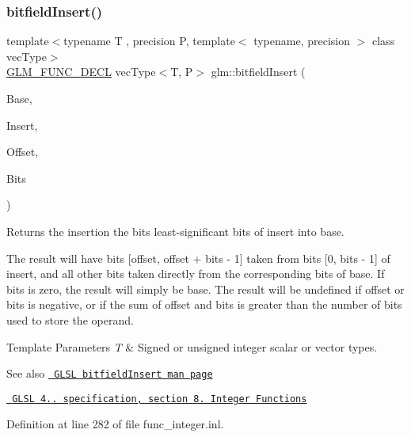 \subsubsection{\texorpdfstring{bitfieldInsert()}{bitfieldInsert()}}
{\footnotesize\ttfamily template$<$typename T , precision P, template$<$ typename, precision $>$ class vec\+Type$>$ \\
\mbox{\hyperlink{setup_8hpp_ab2d052de21a70539923e9bcbf6e83a51}{G\+L\+M\+\_\+\+F\+U\+N\+C\+\_\+\+D\+E\+CL}} vec\+Type$<$T, P$>$ glm\+::bitfield\+Insert (\begin{DoxyParamCaption}\item[{vec\+Type$<$ T, P $>$ const \&}]{Base,  }\item[{vec\+Type$<$ T, P $>$ const \&}]{Insert,  }\item[{int}]{Offset,  }\item[{int}]{Bits }\end{DoxyParamCaption})}

Returns the insertion the bits least-\/significant bits of insert into base.

The result will have bits \mbox{[}offset, offset + bits -\/ 1\mbox{]} taken from bits \mbox{[}0, bits -\/ 1\mbox{]} of insert, and all other bits taken directly from the corresponding bits of base. If bits is zero, the result will simply be base. The result will be undefined if offset or bits is negative, or if the sum of offset and bits is greater than the number of bits used to store the operand.


\begin{DoxyTemplParams}{Template Parameters}
{\em T} & Signed or unsigned integer scalar or vector types.\\
\hline
\end{DoxyTemplParams}
\begin{DoxySeeAlso}{See also}
\href{http://www.opengl.org/sdk/docs/manglsl/xhtml/bitfieldInsert.xml}{\texttt{ G\+L\+SL bitfield\+Insert man page}} 

\href{http://www.opengl.org/registry/doc/GLSLangSpec.4.20.8.pdf}{\texttt{ G\+L\+SL 4.. specification, section 8. Integer Functions}} 
\end{DoxySeeAlso}


Definition at line 282 of file func\+\_\+integer.\+inl.

\mbox{\label{group__core__func__integer_ga153e7e8d0c035f83cce50fc3e580930f}} 
